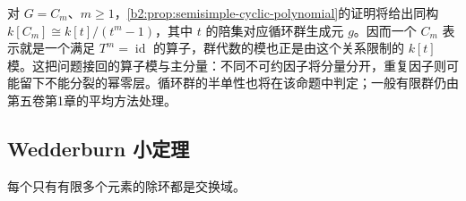 \ProseParagraphBreak
对 \(G=C_m\)、\(m\ge1\)，\cref{b2:prop:semisimple-cyclic-polynomial}的证明将给出同构 \(k[C_m]\cong k[t]/(t^m-1)\)，其中 \(t\) 的陪集对应循环群生成元 \(g\)。因而一个 \(C_m\) 表示就是一个满足 \(T^m=\operatorname{id}\) 的算子，群代数的模也正是由这个关系限制的 \(k[t]\) 模。这把问题接回的算子模与主分量：不同不可约因子将分量分开，重复因子则可能留下不能分裂的幂零层。循环群的半单性也将在该命题中判定；一般有限群仍由第五卷第1章的平均方法处理。

\subsection{Wedderburn 小定理}
\label{b2:subsec:1304:03}

\begin{theorem}\label{b2:thm:wedderburn-little}
	每个只有有限多个元素的除环都是交换域。
\end{theorem}
